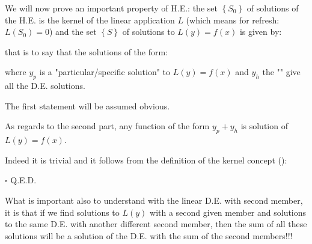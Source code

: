 	\begin{theorem}
	We will now prove an important property of H.E.: the set $\left\lbrace S_0 \right\rbrace$ of solutions of the H.E. is the kernel of the linear application $L$ (which means for refresh: $L(S_0)=0$) and the set  $\left\lbrace S \right\rbrace$ of solutions to $L(y)=f(x)$ is given by:
	
	that is to say that the solutions of the form:
	
	where $y_p$ is a "particular/specific solution" to $L(y)=f(x)$ and $y_h$ the "" give all the D.E. solutions.
	\end{theorem}
	\begin{dem}
	The first statement will be assumed obvious.
	
	As regards to the second part, any function of the form $y_p+y_h$ is solution of $L(y)=f(x)$.
	
	Indeed it is trivial and it follows from the definition of the kernel concept ():
	
	\begin{flushright}
		$\square$  Q.E.D.
	\end{flushright}
	\end{dem}
	What is important also to understand with the linear D.E. with second member, it is that if we find solutions to $L(y)$ with a second given member and solutions to the same D.E. with another different second member, then the sum of all these solutions will be a solution of the D.E. with the sum of the second members!!!
	
